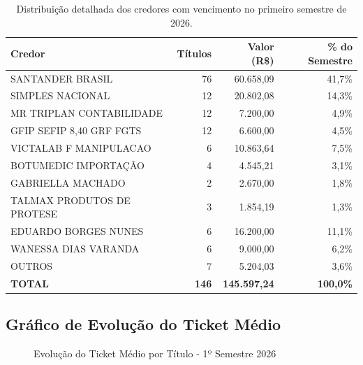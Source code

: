 \documentclass[12pt, a4paper]{article}
\begin{document}
\begin{table}[H]
    \centering
    \renewcommand{\arraystretch}{1.3}
    \begin{tabularx}{\textwidth}{X r r r}
        \toprule
        \rowcolor{tableHeader} \textbf{Credor} & \textbf{Títulos} & \textbf{Valor (R\$)} & \textbf{\% do Semestre} \\
        \midrule
        SANTANDER BRASIL & 76 & 60.658,09 & 41,7\% \\
        SIMPLES NACIONAL & 12 & 20.802,08 & 14,3\% \\
        MR TRIPLAN CONTABILIDADE & 12 & 7.200,00 & 4,9\% \\
        GFIP SEFIP 8,40 GRF FGTS & 12 & 6.600,00 & 4,5\% \\
        VICTALAB F MANIPULACAO & 6 & 10.863,64 & 7,5\% \\
        BOTUMEDIC IMPORTAÇÃO & 4 & 4.545,21 & 3,1\% \\
        GABRIELLA MACHADO & 2 & 2.670,00 & 1,8\% \\
        TALMAX PRODUTOS DE PROTESE & 3 & 1.854,19 & 1,3\% \\
        EDUARDO BORGES NUNES & 6 & 16.200,00 & 11,1\% \\
        WANESSA DIAS VARANDA & 6 & 9.000,00 & 6,2\% \\
        OUTROS & 7 & 5.204,03 & 3,6\% \\
        \midrule
        \rowcolor{lightGray} \textbf{TOTAL} & \textbf{146} & \textbf{145.597,24} & \textbf{100,0\%} \\
        \bottomrule
    \end{tabularx}
    \caption*{\footnotesize Distribuição detalhada dos credores com vencimento no primeiro semestre de 2026.}
\end{table}

\subsection{Gráfico de Evolução do Ticket Médio}

\begin{figure}[H]
    \centering
    \caption{Evolução do Ticket Médio por Título - 1º Semestre 2026}
\end{figure}
\end{document}
